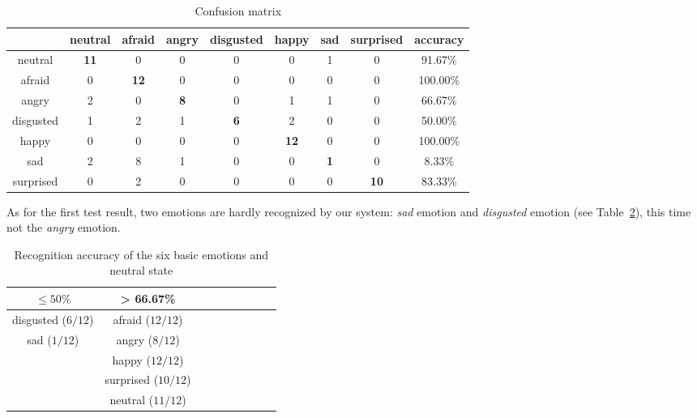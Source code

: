 \begin{table}[h]
\begin{center}
   \caption{\label{table_results_confusion_matrix_weight} Confusion matrix}
\begin{tabular}{|c|c|c|c|c|c|c|c|c|}
  \hline
   & neutral & afraid & angry & disgusted & happy & sad & surprised & accuracy \\
  \hline
  neutral & \textbf{11} & 0 & 0 & 0 & 0 & 1 & 0 & 91.67\% \\
  afraid & 0 & \textbf{12} & 0 & 0 & 0 & 0 & 0 & 100.00\% \\
  angry & 2 & 0 & \textbf{8} & 0 & 1 & 1 & 0 & 66.67\% \\
  disgusted & 1 & 2 & 1 & \textbf{6} & 2 & 0 & 0 & 50.00\% \\
  happy & 0 & 0 & 0 & 0 & \textbf{12} & 0 & 0 & 100.00\% \\
  sad & 2 & 8 & 1 & 0 & 0 & \textbf{1} & 0 & 8.33\% \\
  surprised & 0 & 2 & 0 & 0 & 0 & 0 & \textbf{10} & 83.33\%\\
  \hline
\end{tabular}
\end{center}
\end{table}

\noindent As for the first test result, two emotions are hardly recognized by our system: \textit{sad} emotion and \textit{disgusted} emotion (see Table~\ref{table_results_accuracy_weight}), this time not the \textit{angry} emotion.
\newline

\begin{table}[h]
\begin{center}
   \caption{\label{table_results_accuracy_weight} Recognition accuracy of the six basic emotions and neutral state}
\begin{tabular}{|c|c|c|c|c|c|c|c|c|}
  \hline
   $ \leq 50\% $ & > 66.67\% \\
  \hline
  disgusted ($ 6/12 $) & afraid ($ 12/12 $) \\
  sad ($ 1/12 $) & angry ($ 8/12 $) \\
   & happy ($ 12/12 $) \\
   & surprised ($ 10/12 $) \\
   & neutral ($ 11/12 $) \\
  \hline
\end{tabular}
\end{center} 
\end{table}

